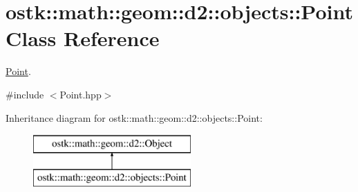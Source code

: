 \hypertarget{classostk_1_1math_1_1geom_1_1d2_1_1objects_1_1_point}{}\section{ostk\+:\+:math\+:\+:geom\+:\+:d2\+:\+:objects\+:\+:Point Class Reference}
\label{classostk_1_1math_1_1geom_1_1d2_1_1objects_1_1_point}


\hyperlink{classostk_1_1math_1_1geom_1_1d2_1_1objects_1_1_point}{Point}.  




{\ttfamily \#include $<$Point.\+hpp$>$}

Inheritance diagram for ostk\+:\+:math\+:\+:geom\+:\+:d2\+:\+:objects\+:\+:Point\+:\begin{figure}[H]
\begin{center}
\leavevmode
\includegraphics[height=2.000000cm]{classostk_1_1math_1_1geom_1_1d2_1_1objects_1_1_point}
\end{center}
\end{figure}
